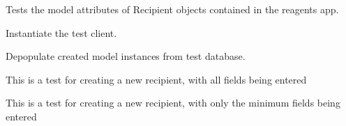 \documentclass[letterpaper,10pt,english]{sphinxmanual}
\begin{document}

\begin{fulllineitems}
\label{api:experimentdb.sharing.tests.RecipientModelTests}
Tests the model attributes of Recipient objects contained in the reagents app.


\begin{fulllineitems}
\label{api:experimentdb.sharing.tests.RecipientModelTests.setUp}
Instantiate the test client.


\end{fulllineitems}


\begin{fulllineitems}
\label{api:experimentdb.sharing.tests.RecipientModelTests.tearDown}
Depopulate created model instances from test database.


\end{fulllineitems}


\begin{fulllineitems}
\label{api:experimentdb.sharing.tests.RecipientModelTests.test_create_recipient_all_fields}
This is a test for creating a new recipient, with all fields being entered


\end{fulllineitems}


\begin{fulllineitems}
\label{api:experimentdb.sharing.tests.RecipientModelTests.test_create_recipient_minimal}
This is a test for creating a new recipient, with only the minimum fields being entered


\end{fulllineitems}


\end{fulllineitems}
\end{document}
